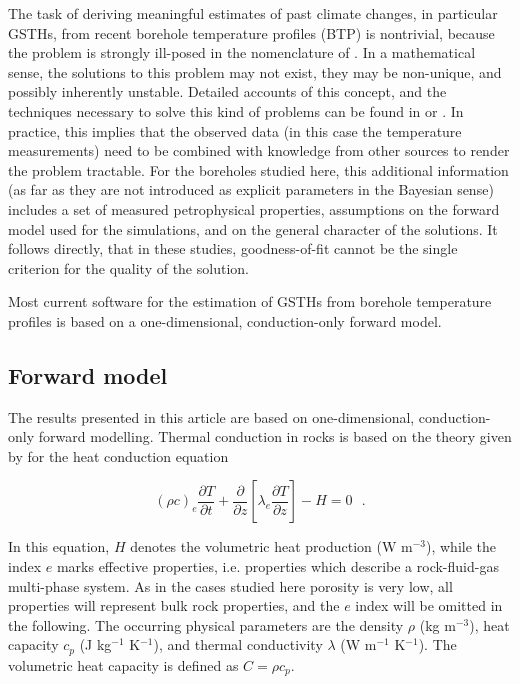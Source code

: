 \documentclass[cp]{copernicus}
\begin{document}
The task of deriving meaningful estimates of past climate changes, in particular GSTHs, from recent 
borehole temperature profiles (BTP) is nontrivial, because the problem is strongly ill-posed in the 
nomenclature of \citet{Hadamard1923a}. In a mathematical sense, the solutions to this problem may 
not exist, they may be non-unique, and possibly inherently unstable. Detailed accounts of this 
concept, and the techniques necessary to solve this kind of problems can be found in 
\citep{Hansen1998a, Hansen2010a} or \citep{Aster2019a}. In practice, this implies that the observed 
data (in this case the temperature measurements) need to be combined with knowledge from other 
sources to render the problem tractable. For the boreholes studied here, this additional 
information 
(as far as they are not introduced as explicit parameters in the Bayesian sense) includes a set of 
measured petrophysical properties, assumptions on the forward model used for the simulations, and 
on 
the general character of the solutions. It follows directly, that in these studies, goodness-of-fit 
cannot be the single criterion for the quality of the solution. 

Most current software for the estimation of GSTHs from borehole temperature profiles is based on a 
one-dimensional, conduction-only forward model.



\subsection{Forward model}
\label{sec:fwd}
The results presented in this article are based on one-dimensional, conduction-only forward 
modelling. Thermal conduction in rocks is based on the theory given by \citet{Carslaw1959a} for 
the heat conduction equation 

\begin{equation}\label{eqn:1}
 {\left( {\rho c} \right)_e}\frac{{\partial T}}{{\partial t}} + \frac{\partial 
}{{\partial z}}\left[ {{\lambda _e}\frac{{\partial T}}{{\partial z}}} \right] - 
H = 0{\text{ }.}
\end{equation} 

In this equation, $H$ denotes the volumetric heat production (W m$^{-3}$), while the index $e$ 
marks 
effective properties, i.e. properties which describe a rock-fluid-gas multi-phase system. As in the 
cases studied here porosity is very low, all properties will represent bulk rock properties, and 
the 
$e$ index will be omitted in the following. The occurring physical parameters are the density 
$\rho$ 
(kg m$^{-3}$), heat capacity $c_p$ (J kg$^{-1}$ K$^{-1}$), and thermal conductivity $\lambda$ (W 
m$^{-1}$ K$^{-1}$). The volumetric heat capacity is defined as $C = \rho c_p$. 
\end{document}
